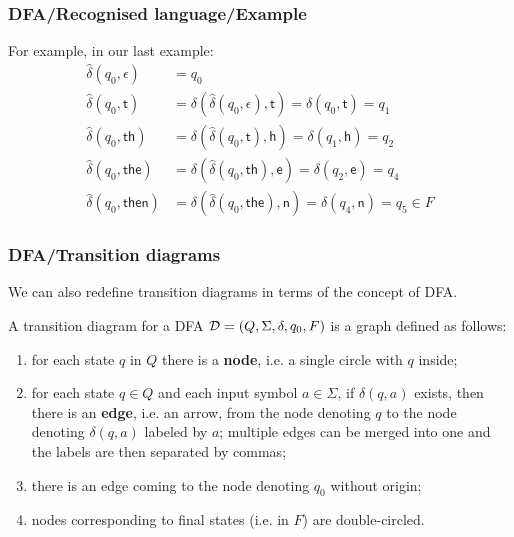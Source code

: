 %
\begin{frame}
\frametitle{DFA/Recognised language/Example}

For example, in our last example:
\[
\begin{aligned}
   \hat{\delta}(q_0, \epsilon)
&= q_0\\
   \hat{\delta}(q_0, \textsf{t})
&= \delta (\hat{\delta}(q_0, \epsilon), \textsf{t})
= \delta (q_0, \textsf{t})
= q_1\\
   \hat{\delta}(q_0, \textsf{th})
&= \delta (\hat{\delta}(q_0, \textsf{t}), \textsf{h})
= \delta (q_1, \textsf{h})
= q_2\\
   \hat{\delta}(q_0, \textsf{the})
&= \delta (\hat{\delta}(q_0, \textsf{th}), \textsf{e})
= \delta (q_2, \textsf{e})
= q_4\\
   \hat{\delta}(q_0, \textsf{then})
&= \delta (\hat{\delta}(q_0, \textsf{the}), \textsf{n})
= \delta (q_4, \textsf{n})
= q_5 \in F
\end{aligned}
\]

\end{frame}

%
\begin{frame}
\frametitle{DFA/Transition diagrams}

We can also redefine transition diagrams in terms of the concept of
DFA.

\bigskip

A transition diagram for a DFA \({\cal D} = (Q, \Sigma, \delta, q_0,
F)\) is a graph defined as follows:
\begin{enumerate}

  \item for each state \(q\) in \(Q\) there is a \textbf{node}, i.e. a
    single circle with \(q\) inside;

  \item for each state \(q \in Q\) and each input symbol \(a \in
    \Sigma\), if \(\delta (q, a)\) exists, then there is an
    \textbf{edge}, i.e. an arrow, from the node denoting \(q\) to the
    node denoting \(\delta (q, a)\) labeled by \(a\); multiple edges
    can be merged into one and the labels are then separated by
    commas;

  \item there is an edge coming to the node denoting \(q_0\) without
    origin;

  \item nodes corresponding to final states (i.e. in \(F\)) are
    double-circled.

\end{enumerate}

\end{frame}

